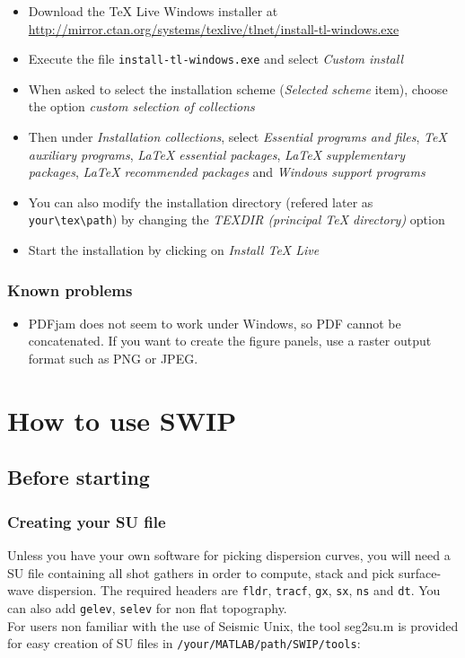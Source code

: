 \documentclass[twoside,a4paper]{article}
\begin{document}
\begin{itemize}
\setlength\itemsep{2ex}
\setlength{\parindent}{5ex}
\item Download the TeX Live Windows installer at \url{http://mirror.ctan.org/systems/texlive/tlnet/install-tl-windows.exe}

\item Execute the file \verb|install-tl-windows.exe| and select \textit{Custom install}

\item When asked to select the installation scheme (\textit{Selected scheme} item), choose the option \textit{custom selection of collections}

\item Then under \textit{Installation collections}, select \textit{Essential programs and files}, \textit{TeX auxiliary programs}, \textit{LaTeX essential packages}, \textit{LaTeX supplementary packages}, \textit{LaTeX recommended packages} and \textit{Windows support programs}

\item You can also modify the installation directory (refered later as \verb|your\tex\path|) by changing the \textit{TEXDIR (principal TeX directory)} option

\item Start the installation by clicking on \textit{Install TeX Live}

\end{itemize}

\subsubsection{Known problems}
\begin{itemize}
\setlength\itemsep{2ex}
\setlength{\parindent}{5ex}
\item PDFjam does not seem to work under Windows, so PDF cannot be concatenated. If you want to create the figure panels, use a raster output format such as PNG or JPEG.

\end{itemize}

\section{How to use SWIP}
\subsection{Before starting}
\subsubsection{Creating your SU file}
Unless you have your own software for picking dispersion curves, you will need a SU file containing all shot gathers in order to compute, stack and pick surface-wave dispersion. The required headers are \verb|fldr|, \verb|tracf|, \verb|gx|, \verb|sx|, \verb|ns| and \verb|dt|. You can also add \verb|gelev|, \verb|selev| for non flat topography.\\[2ex]
For users non familiar with the use of Seismic Unix, the tool seg2su.m is provided for easy creation of SU files in \verb|/your/MATLAB/path/SWIP/tools|:
\end{document}

